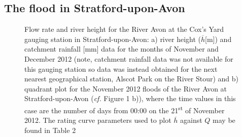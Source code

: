 \documentclass[11pt,a4paper]{article}
\begin{document}
\subsection{The flood in Stratford-upon-Avon}
\begin{figure}[ht!]
\centering
{}
\hfill
{}
\caption{Flow rate and river height for the River Avon at the Cox's Yard gauging station in Stratford-upon-Avon: a) river height ($\overline{h}$[m]) \cite{EA} and catchment rainfall [mm] data \cite{NRFA} for the months of November and December 2012 (note, catchment rainfall data was not available for this gauging station so data was instead obtained for the next nearest geographical station, Alscot Park on the River Stour) and b) quadrant plot for the November 2012 floods of the River Avon at Stratford-upon-Avon (\textit{cf.} Figure 1 b)), where the time values in this case are the number of days from 00:00 on the 21\textsuperscript{st} of November 2012. The rating curve parameters used to plot $\overline{h}$ against $Q$ may be found in Table 2}
\end{figure}
\end{document}
